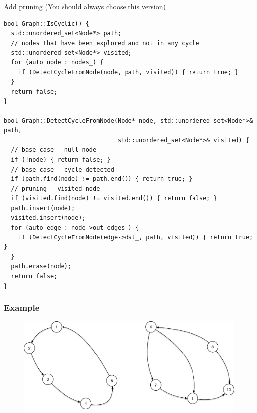 Add pruning (You should always choose this version)
\begin{lstlisting}
bool Graph::IsCyclic() {
  std::unordered_set<Node*> path;
  // nodes that have been explored and not in any cycle
  std::unordered_set<Node*> visited;
  for (auto node : nodes_) {
    if (DetectCycleFromNode(node, path, visited)) { return true; }
  }
  return false;
}

bool Graph::DetectCycleFromNode(Node* node, std::unordered_set<Node*>& path,
                                std::unordered_set<Node*>& visited) {
  // base case - null node
  if (!node) { return false; }
  // base case - cycle detected
  if (path.find(node) != path.end()) { return true; }
  // pruning - visited node
  if (visited.find(node) != visited.end()) { return false; }
  path.insert(node);
  visited.insert(node);
  for (auto edge : node->out_edges_) {
    if (DetectCycleFromNode(edge->dst_, path, visited)) { return true; }
  }
  path.erase(node);
  return false;
}
\end{lstlisting}

\subsubsection{Example}
\begin{figure}[H]
\centering
\includegraphics[width=0.7\linewidth]{images/directed_graph_eg}
\end{figure}

